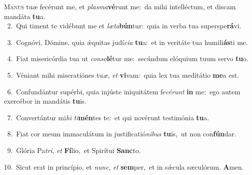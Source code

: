 \lettrine{\initial\textcolor{\initialcolor}{M}}{anus} tuæ fecérunt me, et \textit{plas}\-\textit{ma}\textbf{vé}runt me:~\star da mihi intelléctum, et discam mandáta \textbf{tu}\-a.\\
{\numbfont\textcolor{\numbcolor}{~2.}}~Qui timent te vidébunt me et \textit{læ}\-\textit{ta}\textbf{bún}tur:~\star quia in verba tua superspe\-\textbf{rá}\-vi.\par
{\numbfont\textcolor{\numbcolor}{~3.}}~Cognóvi, Dómine, quia ǽquitas judí\-\textit{ci}\-\textit{a} \textbf{tu}\-a:~\star et in veritáte tua humili\-\textbf{ás}\-ti me.\par
{\numbfont\textcolor{\numbcolor}{~4.}}~Fiat misericórdia tua ut \textit{con}\-\textit{so}\textbf{lé}tur me:~\star secúndum elóquium tuum servo \textbf{tu}\-o.\par
{\numbfont\textcolor{\numbcolor}{~5.}}~Véniant mihi miseratiónes tu\-\textit{æ}\-, \textit{et} \textbf{vi}\-vam:~\star quia lex tua meditátio \textbf{me}\-a est.\par
{\numbfont\textcolor{\numbcolor}{~6.}}~Confundántur supérbi, quia injúste iniquitátem fe\-\textit{cé}\-\textit{runt} \textbf{in} me:~\star ego autem exercébor in mandátis \textbf{tu}\-is.\par
{\numbfont\textcolor{\numbcolor}{~7.}}~Convertántur mi\textit{hi} \textit{ti}\-\textbf{mén}tes te:~\star et qui novérunt testimónia \textbf{tu}\-a.\par
{\numbfont\textcolor{\numbcolor}{~8.}}~Fiat cor meum immaculátum in justificatió\-\textit{ni}\-\textit{bus} \textbf{tu}\-is,~\star ut non con\-\textbf{fún}\-dar.\par
{\numbfont\textcolor{\numbcolor}{~9.}}~Glória Pa\-\textit{tri}\-, \textit{et} \textbf{Fí}\-lio,~\star et Spirítui \textbf{Sanc}\-to.\par
{\numbfont\textcolor{\numbcolor}{10.}}~Sicut erat in princípio, et \textit{nunc}\-, \textit{et} \textbf{sem}\-per,~\star et in sǽcula sæculórum. \textbf{A}\-men.\par
